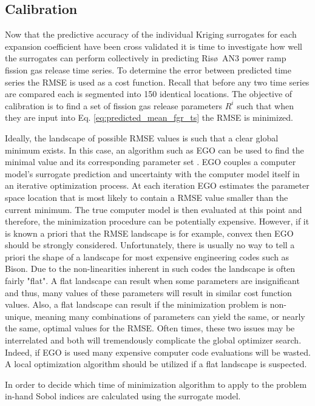 \subsection{Calibration}
\label{\subsec:calibration}

Now that the predictive accuracy of the individual Kriging surrogates for each expansion coefficient have been cross validated it is time to investigate how well the surrogates can perform collectively in predicting Ris\o~AN3 power ramp fission gas release time series. To determine the error between predicted time series the \ac{RMSE} is used as a cost function. Recall that before any two time series are compared each is segmented into 150 identical locations. The objective of calibration is to find a set of fission gas release parameters $R^i$ such that when they are input into Eq. \ref{eq:predicted_mean_fgr_ts} the \ac{RMSE} is minimized. 

Ideally, the landscape of possible \ac{RMSE} values is such that a clear global minimum exists. In this case, an algorithm such as \ac{EGO} can be used to find the minimal value and its corresponding parameter set \cite{Jones_Schonlau}. \ac{EGO} couples a computer model's surrogate prediction and uncertainty with the computer model itself in an iterative optimization process.  At each iteration \ac{EGO} estimates the parameter space location that is most likely to contain a \ac{RMSE} value smaller than the current minimum. The true computer model is then evaluated at this point and therefore, the minimization procedure can be potentially expensive. However, if it is known a priori that the \ac{RMSE} landscape is for example, convex then \ac{EGO} should be strongly considered. Unfortunately, there is usually no way to tell a priori the shape of a landscape for most expensive engineering codes such as Bison. Due to the non-linearities inherent in such codes the landscape is often fairly "flat". A flat landscape can result when some parameters are insignificant and thus, many values of these parameters will result in similar cost function values. Also, a flat landscape can result if the minimization problem is non-unique, meaning many combinations of parameters can yield the same, or nearly the same, optimal values for the \ac{RMSE}. Often times, these two issues may be interrelated and both will tremendously complicate the global optimizer search. Indeed, if \ac{EGO} is used many expensive computer code evaluations will be wasted. A local optimization algorithm should be utilized if a flat landscape is suspected.  

In order to decide which time of minimization algorithm to apply to the problem in-hand Sobol indices are calculated using the surrogate model. 

       






   

